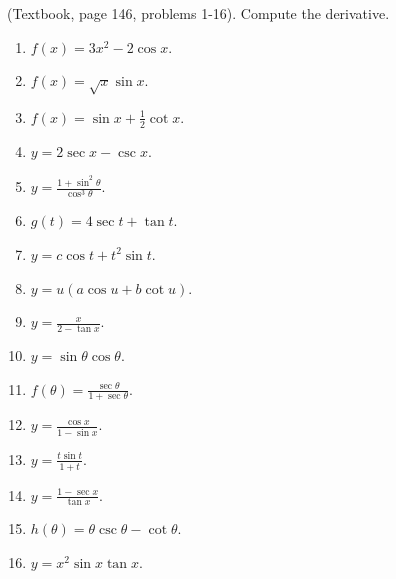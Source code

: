 
(Textbook, page 146, problems 1-16).
Compute the derivative.
\begin{multicols}{2}
\begin{enumerate}
\item $f(x)= 3x^2 -2 \cos x$.

\item $f(x)=\sqrt{x}\sin x$.

\item $f(x)=\sin x +\frac{1}{2}\cot x$.

\item $y=2\sec x - \csc x$.

\item $y=\frac{1+\sin^2\theta}{\cos^3\theta}$.

\item $g(t)=4 \sec t + \tan t$.

\item $y= c\cos t + t^2\sin t$.

\item $y=u(a\cos u + b \cot u)$.

\item $y=\frac{x}{2-\tan x}$.

\item $y=\sin \theta \cos \theta$.

\answer{$\cos (2\theta)= \cos^2\theta- \sin^2\theta$}
\item $f(\theta)=\frac{\sec \theta}{1+\sec \theta}$.

\item $y=\frac{\cos x}{1-\sin x}$.

\item $y=\frac{t\sin t}{1+t}$.

\item $y=\frac{1-\sec x}{\tan x}$.

\item $h(\theta)=\theta \csc \theta -\cot \theta$.

\item $y=x^2\sin x\tan x$.

\end{enumerate}
\end{multicols}
